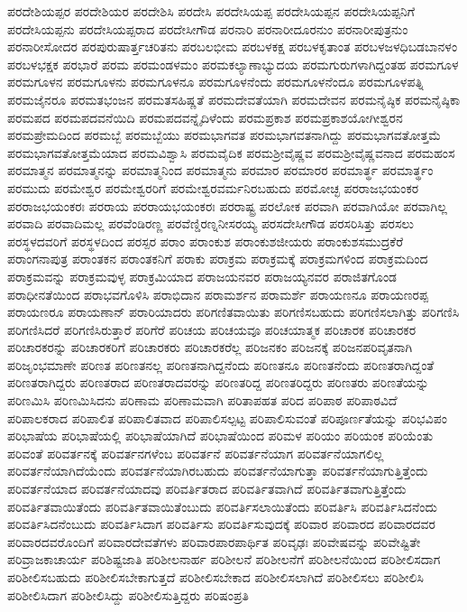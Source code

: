 {ಪರದೇಶಿಯಪ್ಪರ
ಪರದೇಶಿಯರ
ಪರದೇಶಿಸಿ
ಪರದೇಸಿ
ಪರದೇಸಿಯಪ್ಪ
ಪರದೇಸಿಯಪ್ಪನ
ಪರದೇಸಿಯಪ್ಪನಿಗೆ
ಪರದೇಸಿಯಪ್ಪನು
ಪರದೇಸಿಯಪ್ಪರಾದ
ಪರದೇಸೀಗೌಡ
ಪರನಾರಿ
ಪರನಾರೀದೂರನುಂ
ಪರನಾರೀಪುತ್ರನುಂ
ಪರನಾರೀಸೋದರ
ಪರಪುರುಷಾರ್ತ್ತಚರಿತನು
ಪರಬಲಭೀಮ
ಪರಬಳಕಕ್ಷ
ಪರಬಳಕೃತಾಂತ
ಪರಬಳಜಳಧಿಬಡಬಾನಳಂ
ಪರಬಳಭಕ್ಷಕ
ಪರಭಾರೆ
ಪರಮ
ಪರಮಂಡಳಮಂ
ಪರಮಕಲ್ಯಾಣಾಭ್ಯುದಯ
ಪರಮಗುರುಗಳಾಗಿದ್ದಂತಹ
ಪರಮಗೂಳ
ಪರಮಗೂಳನ
ಪರಮಗೂಳನು
ಪರಮಗೂಳನೂ
ಪರಮಗೂಳನೆಂದು
ಪರಮಗೂಳನೆಂದೂ
ಪರಮಗೂಳಪತ್ನಿ
ಪರಮಜೈನರೂ
ಪರಮತಭಂಜನ
ಪರಮತಸಹಿಷ್ಣತೆ
ಪರಮದೇವತೆಯಾಗಿ
ಪರಮದೇವನ
ಪರಮನೈಷ್ಠಿಕ
ಪರಮನೈಷ್ಠಿಕಾ
ಪರಮಪದ
ಪರಮಪದವನೆಯಿದಿ
ಪರಮಪದವನ್ನೈದಿಳೆಂದು
ಪರಮಪ್ರಕಾಶ
ಪರಮಪ್ರಕಾಶಯೋಗೀಶ್ವರನ
ಪರಮಪ್ರೇಮದಿಂದ
ಪರಮಬ್ಬೆ
ಪರಮಬ್ಬೆಯು
ಪರಮಭಾಗವತ
ಪರಮಭಾಗವತನಾಗಿದ್ದು
ಪರಮಭಾಗವತೋತ್ತಮೆ
ಪರಮಭಾಗವತೋತ್ತಮೆಯಾದ
ಪರಮವಿಶ್ವಾಸಿ
ಪರಮವೈದಿಕ
ಪರಮಶ್ರೀವೈಷ್ಣವ
ಪರಮಶ್ರೀವೈಷ್ಣವನಾದ
ಪರಮಹಂಸ
ಪರಮಾತ್ಮನ
ಪರಮಾತ್ಮನನ್ನು
ಪರಮಾತ್ಮನಿಂದ
ಪರಮಾತ್ಮನು
ಪರಮಾರ
ಪರಮಾರರ
ಪರಮಾರ್ತ್ಥ
ಪರಮಾರ್ತ್ಥಂ
ಪರಮುದು
ಪರಮೇಶ್ವರ
ಪರಮೇಶ್ವರರಿಗೆ
ಪರಮೇಶ್ವರವರ್ಮನಿರಬಹುದು
ಪರಮೋಚ್ಛ
ಪರರಾಜಭಯಂಕರ
ಪರರಾಜಭಯಂಕರಃ
ಪರರಾಯ
ಪರರಾಯಭಯಂಕರಃ
ಪರರಾಷ್ಟ್ರ
ಪರಲೋಕ
ಪರವಾಗಿ
ಪರವಾಗಿಯೋ
ಪರವಾಗಿಲ್ಲ
ಪರವಾದಿ
ಪರವಾದಿಮಲ್ಲ
ಪರವೆಂಡಿರಣ್ಣ
ಪರವೆಣ್ಡಿರಣ್ನನೀಸರಯ್ಯ
ಪರಸದೇಸೀಗೌಡ
ಪರಸರಿಸಿತ್ತು
ಪರಸಲು
ಪರಸ್ಥಳದವರಿಗೆ
ಪರಸ್ಥಳದಿಂದ
ಪರಸ್ಪರ
ಪರಾಂ
ಪರಾಂಕುಶ
ಪರಾಂಕುಶಜೀಯರು
ಪರಾಂಕುಶಸಮುದ್ರಕೆರೆ
ಪರಾಂಗನಾಪುತ್ರ
ಪರಾಂತಕನ
ಪರಾಂತಕನಿಗೆ
ಪರಾಕು
ಪರಾಕ್ರಮ
ಪರಾಕ್ರಮಕ್ಕೆ
ಪರಾಕ್ರಮಗಳಿಂದ
ಪರಾಕ್ರಮದಿಂದ
ಪರಾಕ್ರಮವನ್ನು
ಪರಾಕ್ರಮವುಳ್ಳ
ಪರಾಕ್ರಮಿಯಾದ
ಪರಾಜಯನವರ
ಪರಾಜಯ್ಯನವರ
ಪರಾಜಿತಗೊಂಡ
ಪರಾಧೀನತೆಯಿಂದ
ಪರಾಭವಗೊಳಿಸಿ
ಪರಾಭಿದಾನ
ಪರಾಮರ್ಶನ
ಪರಾಮರ್ಶೆ
ಪರಾಯಣನೂ
ಪರಾಯಣರಪ್ಪ
ಪರಾಯಣರೂ
ಪರಾಯಣಾನ್
ಪರಾರಿಯಾದರು
ಪರಿಗಣಿತವಾಯಿತು
ಪರಿಗಣಿಸಬಹುದು
ಪರಿಗಣಿಸಲಾಗಿತ್ತು
ಪರಿಗಣಿಸಿ
ಪರಿಗಣಿಸಿದರೆ
ಪರಿಗಣಿಸಿರುತ್ತಾರೆ
ಪರಿಗೆರೆ
ಪರಿಚಯ
ಪರಿಚಯವೂ
ಪರಿಚಯಾತ್ಮಕ
ಪರಿಚಾರಕ
ಪರಿಚಾರಕರ
ಪರಿಚಾರಕರನ್ನು
ಪರಿಚಾರಕರಿಗೆ
ಪರಿಚಾರಕರು
ಪರಿಚಾರಕರೆಲ್ಲ
ಪರಿಜನಕಂ
ಪರಿಜನಕ್ಕೆ
ಪರಿಜನಪರಿವೃತನಾಗಿ
ಪರಿಜೃಂಭಮಾಣೇ
ಪರಿಣತ
ಪರಿಣತನಲ್ಲ
ಪರಿಣತನಾಗಿದ್ದನೆಂದು
ಪರಿಣತನೂ
ಪರಿಣತನೆಂದು
ಪರಿಣತರಾಗಿದ್ದಂತೆ
ಪರಿಣತರಾಗಿದ್ದರು
ಪರಿಣತರಾದ
ಪರಿಣತರಾದವರನ್ನು
ಪರಿಣತರಿದ್ದ
ಪರಿಣತರಿದ್ದರು
ಪರಿಣತರು
ಪರಿಣತೆಯನ್ನು
ಪರಿಣಮಿಸಿ
ಪರಿಣಮಿಸಿದನು
ಪರಿಣಾಮ
ಪರಿಣಾಮವಾಗಿ
ಪರಿತಾಪಹತ
ಪರಿದ
ಪರಿಪಾಠ
ಪರಿಪಾಠವಿದೆ
ಪರಿಪಾಲಕರಾದ
ಪರಿಪಾಲಿತ
ಪರಿಪಾಲಿತವಾದ
ಪರಿಪಾಲಿಸಲ್ಪಟ್ಟ
ಪರಿಪಾಲಿಸುವಂತೆ
ಪರಿಪೂರ್ಣತೆಯನ್ನು
ಪರಿಭವಿಪಂ
ಪರಿಭಾಷೆಯ
ಪರಿಭಾಷೆಯಲ್ಲಿ
ಪರಿಭಾಷೆಯಾಗಿದೆ
ಪರಿಭಾಷೆಯಿಂದ
ಪರಿಮಳ
ಪರಿಯಂ
ಪರಿಯಂಕ
ಪರಿಯೆಂತು
ಪರಿವಂತೆ
ಪರಿವರ್ತನಕ್ಕೆ
ಪರಿವರ್ತನಗಳೆಂಬ
ಪರಿವರ್ತನೆ
ಪರಿವರ್ತನೆಯಾಗ
ಪರಿವರ್ತನೆಯಾಗಲಿಲ್ಲ
ಪರಿವರ್ತನೆಯಾಗಿದೆಯೆಂದು
ಪರಿವರ್ತನೆಯಾಗಿರಬಹುದು
ಪರಿವರ್ತನೆಯಾಗುತ್ತಾ
ಪರಿವರ್ತನೆಯಾಗುತ್ತಿತ್ತೆಂದು
ಪರಿವರ್ತನೆಯಾದ
ಪರಿವರ್ತನೆಯಾದವು
ಪರಿವರ್ತಿತರಾದ
ಪರಿವರ್ತಿತವಾಗಿದೆ
ಪರಿವರ್ತಿತವಾಗುತ್ತಿತ್ತೆಂದು
ಪರಿವರ್ತಿತವಾಯಿತೆಂದು
ಪರಿವರ್ತಿತವಾಯಿತೆಂಬುದು
ಪರಿವರ್ತಿಸಲಾಯಿತೆಂದು
ಪರಿವರ್ತಿಸಿ
ಪರಿವರ್ತಿಸಿದನೆಂದು
ಪರಿವರ್ತಿಸಿದನೆಂಬುದು
ಪರಿವರ್ತಿಸಿದಾಗ
ಪರಿವರ್ತಿಸು
ಪರಿವರ್ತಿಸುವುದಕ್ಕೆ
ಪರಿವಾರ
ಪರಿವಾರದ
ಪರಿವಾರದವರ
ಪರಿವಾರದವರೊಂದಿಗೆ
ಪರಿವಾರದೇವತೆಗಳು
ಪರಿವಾರಪಾರಪಾರ್ಥಿತ
ಪರಿವೃಢಃ
ಪರಿವೇಷವನ್ನು
ಪರಿವೇಷ್ಟಿತೇ
ಪರಿವ್ರಾಜಕಾಚಾರ್ಯ
ಪರಿಶಿಷ್ಟಜಾತಿ
ಪರಿಶೀಲನಾರ್ಹ
ಪರಿಶೀಲನೆ
ಪರಿಶೀಲನೆಗೆ
ಪರಿಶೀಲನೆಯಿಂದ
ಪರಿಶೀಲಿಸದಾಗ
ಪರಿಶೀಲಿಸಬಹುದು
ಪರಿಶೀಲಿಸಬೇಕಾಗುತ್ತದೆ
ಪರಿಶೀಲಿಸಬೇಕಾದ
ಪರಿಶೀಲಿಸಲಾಗಿದೆ
ಪರಿಶೀಲಿಸಲು
ಪರಿಶೀಲಿಸಿ
ಪರಿಶೀಲಿಸಿದಾಗ
ಪರಿಶೀಲಿಸಿದ್ದು
ಪರಿಶೀಲಿಸುತ್ತಿದ್ದರು
ಪರಿಷಂಪ್ರತಿ
}
